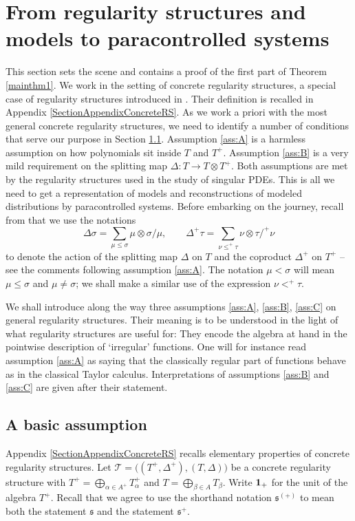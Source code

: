\documentclass[11pt]{article}
\numberwithin{equation}{section}
\theoremstyle{plain}
\theoremstyle{definition}
\newcommand{\scrT}{\mathscr{T}}
\newcommand{\frks}{\mathfrak{s}}
\begin{document}
\section{From regularity structures and models to paracontrolled systems}
\label{SectionRStoPC}

This section sets the scene and contains a proof of the first part of Theorem \ref{mainthm1}. We work in the setting of concrete regularity structures, a special case of regularity structures introduced in \cite{BH}. Their definition is recalled in Appendix \ref{SectionAppendixConcreteRS}. As we work a priori with the most general concrete regularity structures, we need to identify a number of conditions that serve our purpose in Section \ref{SubsectionBasicAssump}. Assumption \eqref{ass:A} is a harmless assumption on how polynomials sit inside $T$ and $T^+$. Assumption \eqref{ass:B} is a very mild requirement on the splitting map $\Delta : T\to T\otimes T^+$. Both assumptions are met by the regularity structures used in the study of singular PDEs. This is all we need to get a representation of models and reconstructions of modeled distributions by paracontrolled systems. Before embarking on the journey, recall from \cite{BH} that we use the notations
\[
\Delta\sigma = \sum_{\mu\leq\sigma} \mu\otimes\sigma/\mu, \qquad \Delta^+\tau = \sum_{\nu\leq^+\tau} \nu\otimes\tau/^+\nu
\]
to denote the action of the splitting map $\Delta$ on $T$ and the coproduct $\Delta^+$ on $T^+$ -- see the comments following assumption \eqref{ass:A}. The notation $\mu<\sigma$ will mean $\mu\leq \sigma$ and $\mu\neq\sigma$; we shall make a similar use of the expression $\nu<^+\tau$.

We shall introduce along the way three assumptions \eqref{ass:A}, \eqref{ass:B}, \eqref{ass:C} on general regularity structures. Their meaning is to be understood in the light of what regularity structures are useful for: They encode the algebra at hand in the pointwise description of `irregular' functions. One will for instance read assumption \eqref{ass:A} as saying that the classically regular part of functions behave as in the classical Taylor calculus. Interpretations of assumptions \eqref{ass:B} and \eqref{ass:C} are given after their statement.

\subsection{A basic assumption}
\label{SubsectionBasicAssump}

Appendix \ref{SectionAppendixConcreteRS} recalls elementary properties of concrete regularity structures. Let $\scrT=\bigl((T^+,\Delta^+),(T,\Delta)\bigr)$ be a concrete regularity structure with $T^+ = \bigoplus_{\alpha\in A^+}T_\alpha^+$ and $T=\bigoplus_{\beta\in A} T_\beta$. Write ${\bf 1}_+$ for the unit of the algebra $T^+$. Recall that we agree to use the shorthand notation $\frks^{(+)}$ to mean both the statement $\frks$ and the statement $\frks^+$.
\end{document}

